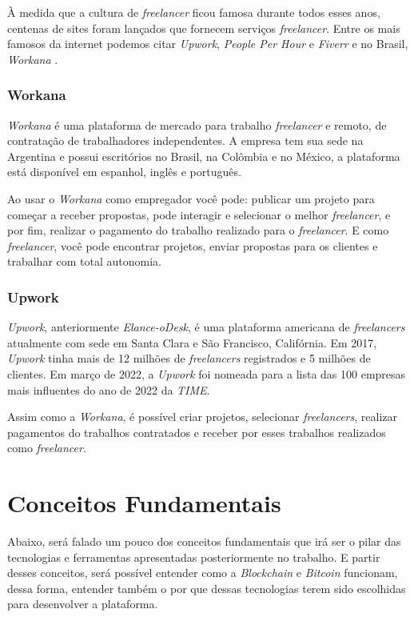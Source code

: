 À medida que a cultura de \textit{freelancer} ficou famosa durante todos esses anos, centenas de sites foram lançados que fornecem serviços \textit{freelancer}. Entre os mais famosos da internet podemos citar \textit{Upwork}, \textit{People Per Hour} e \textit{Fiverr} e no Brasil, \textit{Workana} \cite{the_freelancer}.

\subsubsection{Workana}

\textit{Workana} é uma plataforma de mercado para trabalho \textit{freelancer} e remoto, de contratação de trabalhadores independentes. A empresa tem sua sede na Argentina e possui escritórios no Brasil, na Colômbia e no México, a plataforma está disponível em espanhol, inglês e português. \cite{workana}

Ao usar o \textit{Workana} como empregador você pode: publicar um projeto para começar a receber propostas, pode interagir e selecionar o melhor \textit{freelancer}, e por fim, realizar o pagamento do trabalho realizado para o \textit{freelancer}. E como \textit{freelancer}, você pode encontrar projetos, enviar propostas para os clientes e trabalhar com total autonomia. \cite{workana}

\subsubsection{Upwork}

\textit{Upwork}, anteriormente \textit{Elance-oDesk}, é uma plataforma americana de \textit{freelancers} atualmente com sede em Santa Clara e São Francisco, Califórnia. Em 2017, \textit{Upwork} tinha mais de 12 milhões de \textit{freelancers} registrados e 5 milhões de clientes. Em março de 2022, a \textit{Upwork} foi nomeada para a lista das 100 empresas mais influentes do ano de 2022 da \textit{TIME}. \cite{upwork}

Assim como a \textit{Workana}, é possível criar projetos, selecionar \textit{freelancers}, realizar pagamentos do trabalhos contratados e receber por esses trabalhos realizados como \textit{freelancer}.

\section{Conceitos Fundamentais}

Abaixo, será falado um pouco dos conceitos fundamentais que irá ser o pilar das tecnologias e ferramentas apresentadas posteriormente no trabalho. E partir desses conceitos, será possível entender como a \textit{Blockchain} e \textit{Bitcoin} funcionam, dessa forma, entender também o por que dessas tecnologias terem sido escolhidas para desenvolver a plataforma.

